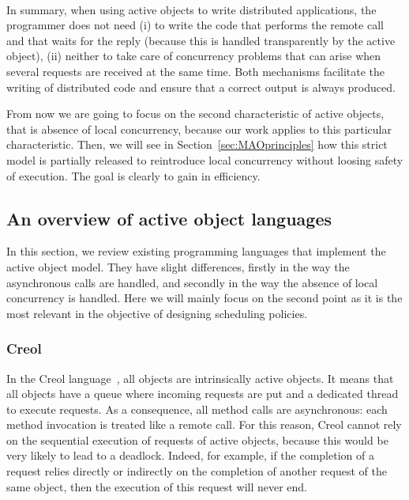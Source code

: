 \documentclass[11pt]{report}
\begin{document}
\paragraph{}
In summary, when using active objects to write distributed applications, the programmer does not need (i) to write the code that performs the remote call and that waits for the reply (because this is handled transparently by the active object), (ii) neither to take care of concurrency problems that can arise when several requests are received at the same time. Both mechanisms facilitate the writing of distributed code and ensure that a correct output is always produced.

From now we are going to focus on the second characteristic of active objects, that is absence of local concurrency, because our work applies to this particular characteristic. Then, we will see in Section~\ref{sec:MAOprinciples} how this strict model is partially released to reintroduce local concurrency without loosing safety of execution. The goal is clearly to gain in efficiency.

\subsection{An overview of active object languages}
In this section, we review existing programming languages that implement the active object model. They have slight differences, firstly in the way the asynchronous calls are handled, and secondly in the way the absence of local concurrency is handled. Here we will mainly focus on the second point as it is the most relevant in the objective of designing scheduling policies.

\subsubsection{Creol}\label{sec:Creol}
In the Creol language~\cite{ref:creol}, all objects are intrinsically active objects. It means that all objects have a queue where incoming requests are put and a dedicated thread to execute requests. As a consequence, all method calls are asynchronous: each method invocation is treated like a remote call. For this reason, Creol cannot rely on the sequential execution of requests of active objects, because this would be very likely to lead to a deadlock. Indeed, for example, if the completion of a request relies directly or indirectly on the completion of another request of the same object, then the execution of this request will never end.
\end{document}
